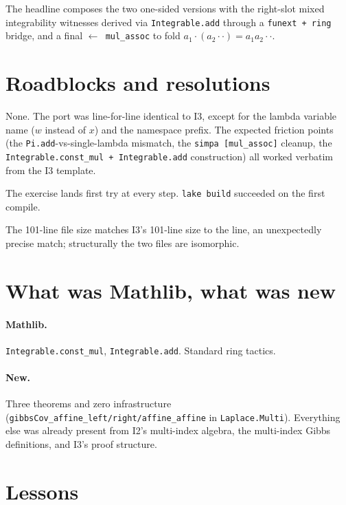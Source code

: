 \documentclass[11pt]{article}
\begin{document}
The headline composes the two one-sided versions with the right-slot
mixed integrability witnesses derived via \texttt{Integrable.add}
through a \texttt{funext + ring} bridge, and a final
\texttt{$\leftarrow$ mul\_assoc} to fold $a_1 \cdot (a_2 \cdot \cdot) = a_1 a_2 \cdot \cdot$.

\section{Roadblocks and resolutions}

None. The port was line-for-line identical to I3, except for
the lambda variable name ($w$ instead of $x$) and the namespace
prefix. The expected friction points (the \texttt{Pi.add}-vs-single-lambda
mismatch, the \texttt{simpa [mul\_assoc]} cleanup, the
\texttt{Integrable.const\_mul + Integrable.add} construction) all
worked verbatim from the I3 template.

The exercise lands first try at every step. \texttt{lake build}
succeeded on the first compile.

The 101-line file size matches I3's 101-line size to the line, an
unexpectedly precise match; structurally the two files are
isomorphic.

\section{What was Mathlib, what was new}

\paragraph{Mathlib.} \texttt{Integrable.const\_mul},
\texttt{Integrable.add}. Standard ring tactics.

\paragraph{New.} Three theorems and zero infrastructure
(\texttt{gibbsCov\_affine\_left/right/affine\_affine} in
\texttt{Laplace.Multi}). Everything else was already present from I2's
multi-index algebra, the multi-index Gibbs definitions, and I3's
proof structure.

\section{Lessons}
\end{document}
